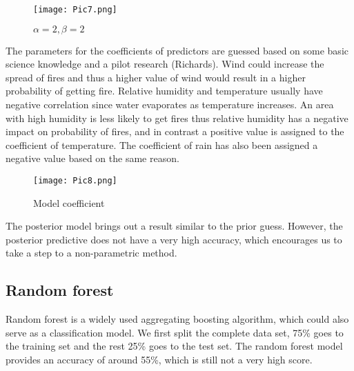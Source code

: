 \documentclass[12pt]{article}
\theoremstyle{plain}
\begin{document}
\begin{spacing}{1}
\begin{flushleft}
 \vspace{2.0mm}
 
 
    \begin{figure}[htp]
 	\centering  
 	\texttt{[image: Pic7.png]}
 	\caption{$\alpha=2, \beta=2$}
 	\label{fig:figure1label}
 \end{figure}
 
 \vspace{2.0mm}
 
 
 The parameters for the coefficients of predictors are guessed based on some basic science knowledge and a pilot research (Richards). Wind could increase the spread of fires and thus a higher value of wind would result in a higher probability of getting fire. Relative humidity and temperature usually have negative correlation since water evaporates as temperature increases. An area with high humidity is less likely to get fires thus relative humidity has a negative impact on probability of fires, and in contrast a positive value is assigned to the coefficient of temperature. The coefficient of rain has also been assigned a negative value based on the same reason.
 

 
     \begin{figure}[htp]
 	\centering  
 	\texttt{[image: Pic8.png]}
 	\caption{Model coefficient}
 	\label{fig:figure1label}
 \end{figure}
 

 
 The posterior model brings out a result similar to the prior guess. However, the posterior predictive does not have a very high accuracy, which encourages us to take a step to a non-parametric method.
 
 \vspace{2.0mm}
 
 
 \subsection{Random forest}
 
 Random forest is a widely used aggregating boosting algorithm, which could also serve as a classification model. We first split the complete data set, 75\% goes to the training set and the rest 25\% goes to the test set. 
 The random forest model provides an accuracy of around 55\%, which is still not a very high score.
 
 \vspace{2.0mm}
 

 \newpage

\end{flushleft}
\end{spacing}
\end{document}
